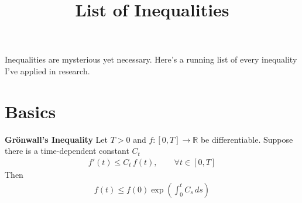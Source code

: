 \documentclass{article}
\title{List of Inequalities}
\date{}
\begin{document}
\maketitle

Inequalities are mysterious yet necessary. Here's a running list of every inequality I've applied in research.

\section{Basics}

\textbf{Gr\"onwall's Inequality}
Let $T>0$ and $f: [0,T] \to \mathbb R$ be differentiable. Suppose there is a time-dependent constant $C_t$
\begin{align}
    f'(t) \leq C_t \, f(t), \qquad \forall t \in [0,T]
\end{align}
Then
\begin{align}
    f(t) \leq f(0) \exp \left(\int_0^t C_s\, ds \right)
\end{align}
\end{document}
